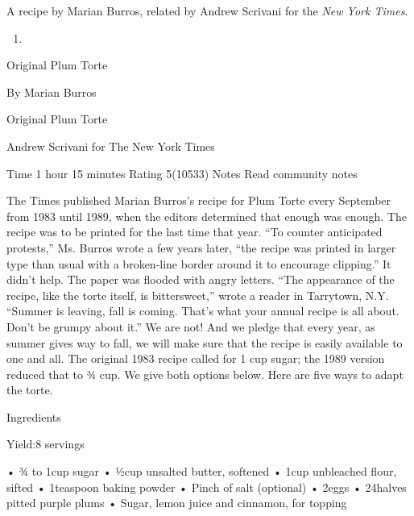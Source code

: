 
A recipe by Marian Burros, related by Andrew Scrivani for the
\textit{New York Times}.

\begin{ingredients}
  \ingr{}{}{}
  \ingr{}{}{}
  \ingr{}{}{}
  \ingr{}{}{}
  \ingr{}{}{}
  \ingr{}{}{}
  \ingr{}{}{}
  \ingr{}{}{}
  \ingr{}{}{}
  \ingr{}{}{}
\end{ingredients}


\begin{recipe}
  \begin{enumerate}

  \item 

  \end{enumerate}
\end{recipe}



Original Plum Torte

By Marian Burros

Original Plum Torte

Andrew Scrivani for The New York Times

Time
    1 hour 15 minutes
Rating
    5(10533)
Notes
    Read community notes

The Times published Marian Burros’s recipe for Plum Torte every September from 1983 until 1989, when the
editors determined that enough was enough. The recipe was to be printed for the last time that year. “To
counter anticipated protests,” Ms. Burros wrote a few years later, “the recipe was printed in larger
type than usual with a broken-line border around it to encourage clipping.” It didn’t help. The paper
was flooded with angry letters. “The appearance of the recipe, like the torte itself, is bittersweet,”
wrote a reader in Tarrytown, N.Y. “Summer is leaving, fall is coming. That's what your annual recipe is
all about. Don't be grumpy about it.” We are not! And we pledge that every year, as summer gives way to
fall, we will make sure that the recipe is easily available to one and all. The original 1983 recipe
called for 1 cup sugar; the 1989 version reduced that to ¾ cup. We give both options below. Here are
five ways to adapt the torte.

Ingredients

Yield:8 servings

  • ¾ to 1cup sugar
  • ½cup unsalted butter, softened
  • 1cup unbleached flour, sifted
  • 1teaspoon baking powder
  • Pinch of salt (optional)
  • 2eggs
  • 24halves pitted purple plums
  • Sugar, lemon juice and cinnamon, for topping


